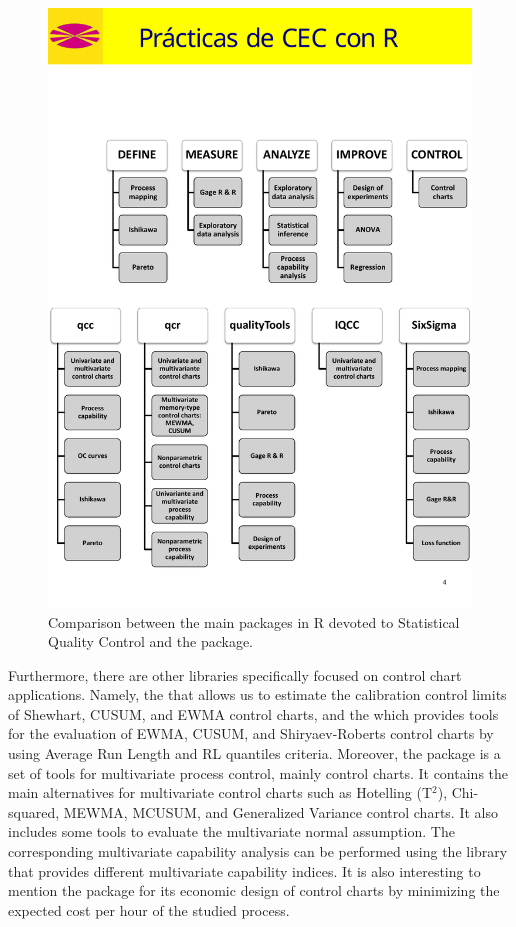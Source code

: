 \begin{figure}[h!]
		\centering	
        \includegraphics[width=0.80\linewidth]{packages.PDF}
        \caption{Comparison between the main packages in R devoted to Statistical Quality Control and the  package.}
        \label{packages}
	\end{figure}   
    
Furthermore, there are other libraries specifically focused on control chart applications. Namely, the  \citep{spcadjust} that allows us to estimate the calibration control limits of Shewhart, CUSUM, and EWMA control charts, and the  \citep{spc} which provides tools for the evaluation of EWMA, CUSUM, and Shiryaev-Roberts control charts by using Average Run Length and RL quantiles criteria. Moreover, the  package  \citep{santos2016package} is a set of tools for multivariate process control, mainly control charts. It contains the main alternatives for multivariate control charts such as Hotelling (T$^2$), Chi-squared, MEWMA, MCUSUM, and Generalized Variance control charts. It also includes some tools to evaluate the multivariate normal assumption. The corresponding multivariate capability analysis can be performed using the  library \citep{MPCI} that provides different multivariate capability indices. It is also interesting to mention the  package \citep{edcc} for its economic design of control charts by minimizing the expected cost per hour of the studied process. %

